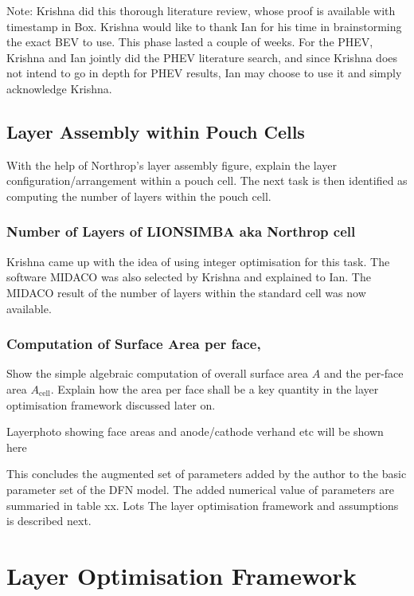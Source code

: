 Note: Krishna did this thorough literature review, whose proof is available with
timestamp in Box. Krishna would like to  thank Ian for his time in brainstorming
the exact BEV to use. This phase lasted a couple of weeks. For the PHEV, Krishna
and  Ian jointly  did the  PHEV literature  search, and  since Krishna  does not
intend to  go in depth  for PHEV results,  Ian may choose  to use it  and simply
acknowledge Krishna.

\subsection{Layer Assembly within Pouch Cells}
With  the  help   of  Northrop's  layer  assembly  figure,   explain  the  layer
configuration/arrangement within a pouch cell.  The next task is then identified
as computing the number of layers within the pouch cell.

\subsubsection*{Number of Layers of LIONSIMBA aka Northrop cell}
Krishna came up with  the idea of using integer optimisation  for this task. The
software MIDACO  was also selected by  Krishna and explained to  Ian. The MIDACO
result of the number of layers within the standard cell was now available.

\subsubsection*{Computation of Surface Area per face, }
Show  the simple  algebraic  computation of  overall surface  area  $A$ and  the
per-face area  $A_\text{cell}$. Explain  how the  area per face  shall be  a key
quantity in the layer optimisation framework discussed later on.

Layerphoto showing face areas and anode/cathode verhand etc will be shown here

This concludes the augmented set of parameters  added by the author to the basic
parameter set  of the  DFN model.  The added numerical  value of  parameters are
summaried in table xx. Lots The  layer optimisation framework and assumptions is
described next. %

\section{Layer Optimisation Framework}

